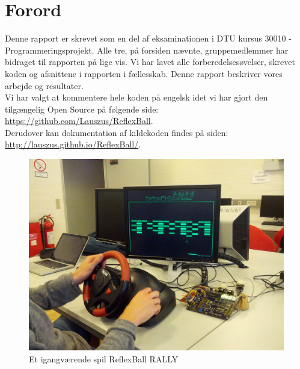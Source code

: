 \chapter{Forord}

Denne rapport er skrevet som en del af eksaminationen i DTU kursus 30010 - Programmeringsprojekt. Alle tre, på forsiden nævnte, gruppemedlemmer har bidraget til rapporten på lige vis. Vi har lavet alle forberedelsesøvelser, skrevet koden og afsnittene i rapporten i fællesskab. Denne rapport beskriver vores arbejde og resultater.
\\

Vi har valgt at kommentere hele koden på engelsk idet vi har gjort den tilgængelig Open Source på følgende side: \url{https://github.com/Lauszus/ReflexBall}.\\
Derudover kan dokumentation af kildekoden findes på siden: \url{http://lauszus.github.io/ReflexBall/}.
\\

\begin{figure}[h!]
\centering
\includegraphics[width=\textwidth]{figs/forside.jpg}
\caption{Et igangværende spil ReflexBall RALLY}
\label{fig:forside}
\end{figure}